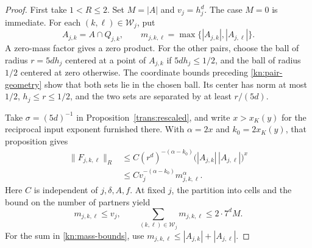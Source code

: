 \documentclass[11pt]{article}
\numberwithin{equation}{section}
\newcommand{\norm}[1]{\lVert #1\rVert}
\begin{document}
\begin{proof}
First take \(1<R\le2\). Set \(M=|A|\) and \(v_j=h_j^d\). The case
\(M=0\) is immediate. For each \((k,\ell)\in\mathcal W_j\), put
\[
 A_{j,k}=A\cap Q_{j,k},\qquad
 m_{j,k,\ell}=\max\{|A_{j,k}|,|A_{j,\ell}|\}.
\]
A zero-mass factor gives a zero product. For the other pairs,
choose the ball of radius \(r=5d h_j\) centered at a point of
\(A_{j,k}\) if \(5d h_j\le1/2\), and the ball of radius \(1/2\)
centered at zero otherwise. The coordinate bounds preceding
\eqref{kn:pair-geometry} show that both sets lie in the chosen ball.
Its center has norm at most \(1/2\), \(h_j\le r\le1/2\), and the two
sets are separated by at least \(r/(5d)\).

Take \(\sigma=(5d)^{-1}\) in Proposition~\ref{trans:rescaled}, and
write \(x>x_K(y)\) for the reciprocal input exponent furnished there.
With \(\alpha=2x\) and \(k_0=2x_K(y)\), that proposition gives
\begin{equation}\label{kn:pair-bound}
 \begin{split}
 \norm{F_{j,k,\ell}}_R
 &\le C(r^d)^{-(\alpha-k_0)}
       \big(|A_{j,k}|\,|A_{j,\ell}|\big)^x\\
 &\le C v_j^{-(\alpha-k_0)} m_{j,k,\ell}^{\alpha}.
 \end{split}
\end{equation}
Here \(C\) is independent of \(j,\delta,A,f\). At fixed \(j\), the
partition into cells and the bound on the number of partners yield
\begin{equation}\label{kn:mass-bounds}
 m_{j,k,\ell}\le v_j,
 \qquad
 \sum_{(k,\ell)\in\mathcal W_j}m_{j,k,\ell}\le 2\cdot7^d M.
\end{equation}
For the sum in \eqref{kn:mass-bounds}, use
\(m_{j,k,\ell}\le |A_{j,k}|+|A_{j,\ell}|\).


\end{proof}
\end{document}
